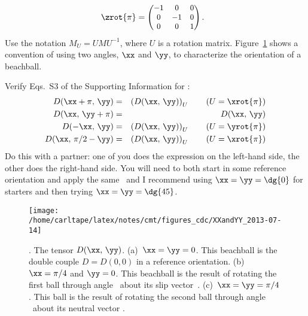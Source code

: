 \documentclass[11pt,titlepage,fleqn]{article}
\begin{document}
\begin{enumerate}
\begin{equation*}
\zrot{\pi}=\begin{small}\begin{pmatrix}   -1 & 0 & 0 \\
                                          0 & -1 & 0 \\
                                          0  & 0 & 1\end{pmatrix}\end{small}.\:\:\:
\label{eq:DefXxiYxiZxi}
\end{equation*}
%
Use the notation $M_U=UMU^{-1}$, where $U$ is a rotation matrix. Figure~\ref{fig:XXandYY} shows a convention of using two angles, $\xx$ and $\yy$, to characterize the orientation of a beachball.

Verify Eqs.~S3 of the Supporting Information for \citet{TapeTape2013}:
%
\begin{eqnarray}
D(\xx+\pi,\,\yy)&=&\left(D(\xx,\,\yy)\right)_U\hspace{20pt}(U=\xrot{\pi})
\label{eq1}
\\
D(\xx,\,\yy+\pi)&=&D(\xx,\,\yy)
\label{eq2}
\\
D(-\xx,\,\yy)&=&\left(D(\xx,\,\yy)\right)_U\hspace{20pt}(U=\yrot{\pi})
\label{eq3}
\\
D(\xx,\,\pi/2-\yy)&=&\left(D(\xx,\,\yy)\right)_U\hspace{20pt}(U=\xrot{\pi})
\label{eq4}
\end{eqnarray}
%
Do this with a partner: one of you does the expression on the left-hand side, the other does the right-hand side. You will need to both start in some reference orientation and apply the same \xx\ and \yy\; I recommend using $\xx=\yy=\dg{0}$ for starters and then trying $\xx=\yy=\dg{45}$.

\end{enumerate}


\begin{figure}[h]
\center
\texttt{[image: /home/carltape/latex/notes/cmt/figures\_cdc/XXandYY\_2013-07-14]}
\caption{
\citep[Figure~8 of][]{TapeTape2013}. The tensor $D(\xx,\,\yy)$.
(a)~$\xx=\yy=0$. This beachball is the double couple $D=D(0,0)$ in a reference orientation.
(b)~$\xx=\pi/4$ and $\yy=0$. This beachball is the result of rotating the first ball through angle \xx\ about its slip vector~\mbS.
(c)~$\xx=\yy=\pi/4$. This ball is the result of rotating the second ball through angle \yy\ about its neutral vector \mbB.
\label{fig:XXandYY}
}
\end{figure}




\end{document}
